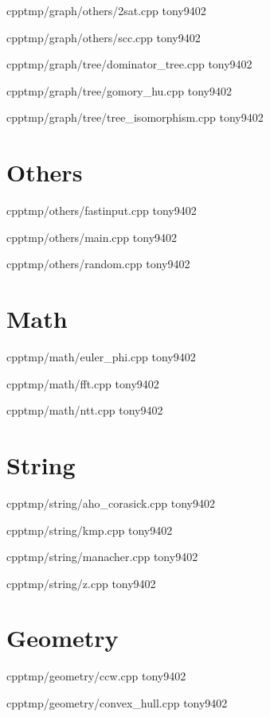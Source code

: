 {}
{}
{}
{cpp}{tmp/graph/others/2sat.cpp}
{tony9402}



{}
{}
{}
{cpp}{tmp/graph/others/scc.cpp}
{tony9402}



{}
{}
{}
{cpp}{tmp/graph/tree/dominator_tree.cpp}
{tony9402}



{}
{}
{}
{cpp}{tmp/graph/tree/gomory_hu.cpp}
{tony9402}



{}
{}
{}
{cpp}{tmp/graph/tree/tree_isomorphism.cpp}
{tony9402}


\section{Others}


{}
{}
{}
{cpp}{tmp/others/fastinput.cpp}
{tony9402}



{}
{}
{}
{cpp}{tmp/others/main.cpp}
{tony9402}



{}
{}
{}
{cpp}{tmp/others/random.cpp}
{tony9402}


\section{Math}


{}
{}
{}
{cpp}{tmp/math/euler_phi.cpp}
{tony9402}



{}
{}
{}
{cpp}{tmp/math/fft.cpp}
{tony9402}



{}
{}
{}
{cpp}{tmp/math/ntt.cpp}
{tony9402}


\section{String}


{}
{}
{}
{cpp}{tmp/string/aho_corasick.cpp}
{tony9402}



{}
{}
{}
{cpp}{tmp/string/kmp.cpp}
{tony9402}



{}
{}
{}
{cpp}{tmp/string/manacher.cpp}
{tony9402}



{}
{}
{}
{cpp}{tmp/string/z.cpp}
{tony9402}


\section{Geometry}


{}
{}
{}
{cpp}{tmp/geometry/ccw.cpp}
{tony9402}



{}
{}
{}
{cpp}{tmp/geometry/convex_hull.cpp}
{tony9402}
